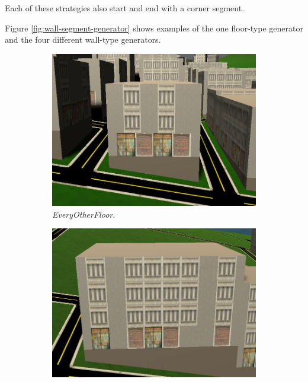 Each of these strategies also start and end with a corner segment. 

Figure \ref{fig:wall-segment-generator} shows examples of the one floor-type generator and the four different wall-type generators.

\begin{figure}[H]
  \centering

  \begin{subfigure}[b]{0.3\textwidth}
    \includegraphics[width=\textwidth]{figure/building-every-other.PNG}
    \caption{\textit{EveryOtherFloor}.}
  \end{subfigure}
  \quad
  \begin{subfigure}[b]{0.3\textwidth}
    \includegraphics[width=\textwidth]{figure/building-normal.PNG}

\end{subfigure}
\end{figure}
